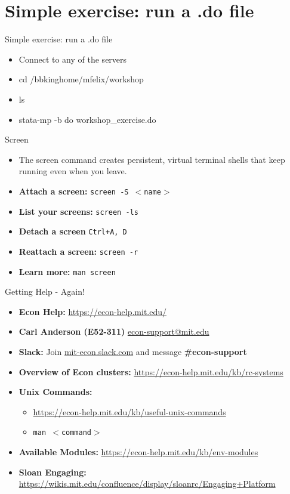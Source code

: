\documentclass{beamer}
\begin{document}
\section{Simple exercise: run a .do file}
\begin{frame}{Simple exercise: run a .do file}
\begin{itemize}
    \item Connect to any of the servers
    \item cd /bbkinghome/mfelix/workshop
    \item ls
    \item stata-mp -b do workshop\_exercise.do
\end{itemize}
\end{frame}  

\begin{frame}{Screen}
    \begin{itemize}
        \item The screen command creates persistent, virtual terminal shells that keep running even when you leave.
        \item \textbf{Attach a screen:} \texttt{screen -S $<$name$>$}
        \item \textbf{List your screens:} \texttt{screen -ls}
        \item \textbf{Detach a screen} \texttt{Ctrl+A, D}
        \item \textbf{Reattach a screen:} \texttt{screen -r}
        \item \textbf{Learn more:} \texttt{man screen}
    \end{itemize}
\end{frame}

\begin{frame}{Getting Help - Again!}
    \begin{itemize}
        \item \textbf{Econ Help:} \url{https://econ-help.mit.edu/}
        \item \textbf{Carl Anderson (E52-311)} \url{econ-support@mit.edu}
        \item \textbf{Slack:} Join \url{mit-econ.slack.com} and message \textbf{\#econ-support}
        \item \textbf{Overview of Econ clusters:} \url{https://econ-help.mit.edu/kb/rc-systems}
        \item \textbf{Unix Commands:}
        \begin{itemize}
            \item \url{https://econ-help.mit.edu/kb/useful-unix-commands}
            \item \texttt{man $<$command$>$} 
        \end{itemize}
        \item \textbf{Available Modules:} \url{https://econ-help.mit.edu/kb/env-modules}
        \item \textbf{Sloan Engaging:} \url{https://wikis.mit.edu/confluence/display/sloanrc/Engaging+Platform}
    \end{itemize}
\end{frame}
\end{document}
